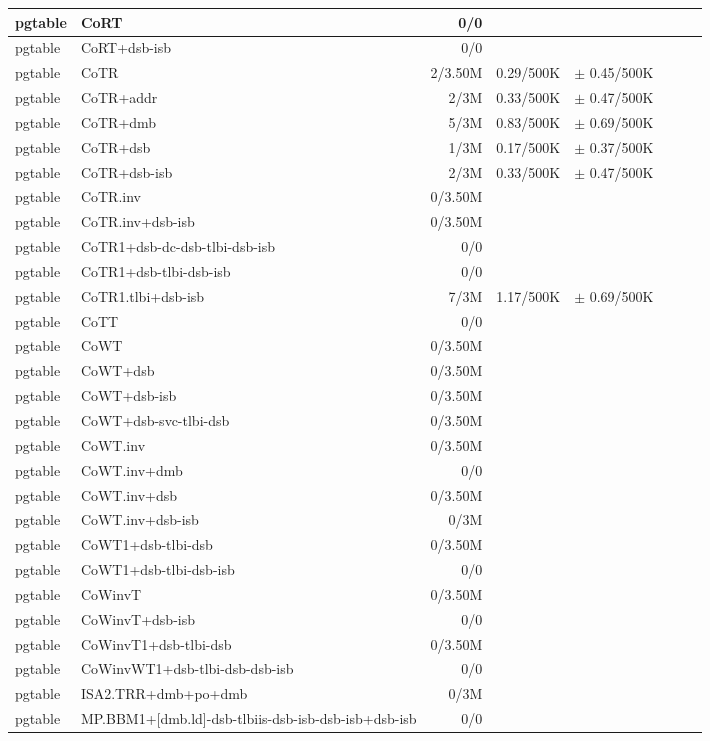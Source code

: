 \begin{tabular}{l l  | r r l | r r l}
   pgtable&CoRT&0/0&&&\\
\hline
   pgtable&CoRT+dsb-isb&0/0&&&\\
\hline
   pgtable&CoTR&2/3.50M&0.29/500K&$\pm$ 0.45/500K&\\
\hline
   pgtable&CoTR+addr&2/3M&0.33/500K&$\pm$ 0.47/500K&\\
\hline
   pgtable&CoTR+dmb&5/3M&0.83/500K&$\pm$ 0.69/500K&\\
\hline
   pgtable&CoTR+dsb&1/3M&0.17/500K&$\pm$ 0.37/500K&\\
\hline
   pgtable&CoTR+dsb-isb&2/3M&0.33/500K&$\pm$ 0.47/500K&\\
\hline
   pgtable&CoTR.inv&0/3.50M&&&\\
\hline
   pgtable&CoTR.inv+dsb-isb&0/3.50M&&&\\
\hline
   pgtable&CoTR1+dsb-dc-dsb-tlbi-dsb-isb&0/0&&&\\
\hline
   pgtable&CoTR1+dsb-tlbi-dsb-isb&0/0&&&\\
\hline
   pgtable&CoTR1.tlbi+dsb-isb&7/3M&1.17/500K&$\pm$ 0.69/500K&\\
\hline
   pgtable&CoTT&0/0&&&\\
\hline
   pgtable&CoWT&0/3.50M&&&\\
\hline
   pgtable&CoWT+dsb&0/3.50M&&&\\
\hline
   pgtable&CoWT+dsb-isb&0/3.50M&&&\\
\hline
   pgtable&CoWT+dsb-svc-tlbi-dsb&0/3.50M&&&\\
\hline
   pgtable&CoWT.inv&0/3.50M&&&\\
\hline
   pgtable&CoWT.inv+dmb&0/0&&&\\
\hline
   pgtable&CoWT.inv+dsb&0/3.50M&&&\\
\hline
   pgtable&CoWT.inv+dsb-isb&0/3M&&&\\
\hline
   pgtable&CoWT1+dsb-tlbi-dsb&0/3.50M&&&\\
\hline
   pgtable&CoWT1+dsb-tlbi-dsb-isb&0/0&&&\\
\hline
   pgtable&CoWinvT&0/3.50M&&&\\
\hline
   pgtable&CoWinvT+dsb-isb&0/0&&&\\
\hline
   pgtable&CoWinvT1+dsb-tlbi-dsb&0/3.50M&&&\\
\hline
   pgtable&CoWinvWT1+dsb-tlbi-dsb-dsb-isb&0/0&&&\\
\hline
   pgtable&ISA2.TRR+dmb+po+dmb&0/3M&&&\\
\hline
   pgtable&MP.BBM1+[dmb.ld]-dsb-tlbiis-dsb-isb-dsb-isb+dsb-isb&0/0&&&\\
\hline

\end{tabular}
